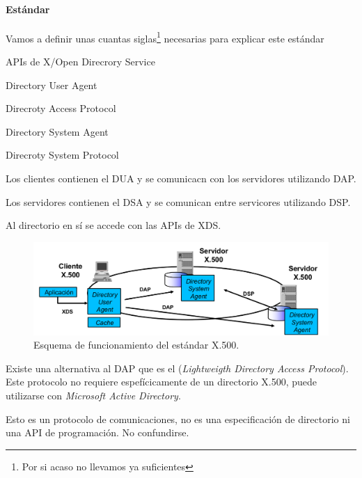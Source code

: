 \paragraph{Estándar }
Vamos a definir unas cuantas siglas\footnote{Por si acaso no llevamos ya suficientes} necesarias para explicar este estándar

\begin{defn}[XDS]
	APIs de X/Open Direcrory Service
\end{defn}

\begin{defn}[DUA]
	Directory User Agent
\end{defn}

\begin{defn}[DAP]
	Direcroty Access Protocol
\end{defn}

\begin{defn}[DSA]
	Directory System Agent
\end{defn}

\begin{defn}[DSP]
	Direcroty System Protocol
\end{defn}

Los clientes contienen el DUA y se comunicacn con los servidores utilizando DAP.

Los servidores contienen el DSA y se comunican entre servicores utilizando DSP.

Al directorio en sí se accede con las APIs de XDS.


\begin{figure}[hbtp]
\centering
\includegraphics[width=1\textwidth]{img/X500.png}
\caption{Esquema de funcionamiento del estándar X.500.}
\label{X500}
\end{figure}

Existe una alternativa al DAP que es el  (\textit{Lightweigth Directory Access Protocol}). Este protocolo no requiere espefícicamente de un directorio X.500, puede utilizarse con \textit{Microsoft Active Directory}.

Esto es un protocolo de comunicaciones, no es una especificación de directorio ni una API de programación. No confundirse.


